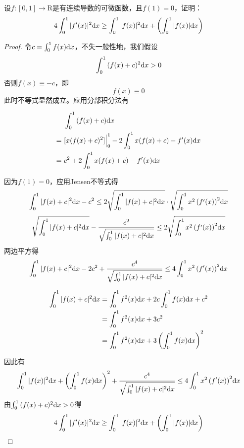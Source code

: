 \begin{proposition}

    设$f:[0,1]\to\mathrm{R}$是有连续导数的可微函数，且$f(1) = 0$，证明：
    $$4\int_{0}^{1}{|f'(x)|^2}\mathrm{d} x \geq \int_{0}^{1}{|f(x)|^2}\mathrm{d} x + \left( \int_{0}^{1}{|f(x)|}\mathrm{d} x \right)$$

\end{proposition}

\begin{proof}
    
    令$c = \int_{0}^{1}{f(x)}\mathrm{d} x$，不失一般性地，我们假设
    $$\int_{0}^{1}{(f(x) + c)^2}\mathrm{d} x > 0$$
    否则$f(x) \equiv -c $，即
    $$f(x) \equiv 0$$
    此时不等式显然成立。应用分部积分法有

    \begin{align*}
        & \int_{0}^{1}{(f(x) + c)}\mathrm{d} x \\
        = \  & [x(f(x) + c)^2] \Big|_{0}^{1} - 2\int_{0}^{1}{x(f(x) + c) - f'(x)}\mathrm{d} x \\
        = \ & c^2 + 2\int_{0}^{1}{x(f(x) + c) - f'(x)}\mathrm{d} x
    \end{align*}

    因为$f(1) = 0$，应用\textup{Jensen}不等式得
    $$ \int_{0}^{1}{|f(x) + c|^2}\mathrm{d} x - c^2 \leq 2\sqrt{\int_{0}^{1}{|f(x) + c|^2}\mathrm{d} x} \cdot \sqrt{\int_{0}^{1}{x^2 \left(f'(x)\right)^2}\mathrm{d} x} $$
    $$ \sqrt{\int_{0}^{1}{|f(x) + c|^2}\mathrm{d} x} - \dfrac{c^2}{\sqrt{\int_{0}^{1}{|f(x) + c|^2}\mathrm{d} x}} \leq 2\sqrt{\int_{0}^{1}{x^2 \left(f'(x)\right)^2}\mathrm{d} x} $$
    两边平方得
    $$\int_{0}^{1}{|f(x) + c|^2}\mathrm{d} x -2c^2 + \dfrac{c^4}{\sqrt{\int_{0}^{1}{|f(x) + c|^2}\mathrm{d} x}} \leq 4 \int_{0}^{1}{x^2 \left(f'(x)\right)^2}\mathrm{d} x $$

    \begin{align*}
        \int_{0}^{1}{|f(x) + c|^2}\mathrm{d} x & = \int_{0}^{1}{f^2(x)}\mathrm{d} x + 2c \int_{0}^{1}{f(x)}\mathrm{d} x + c^2 \\
        & = \int_{0}^{1}{f^2(x)}\mathrm{d} x + 3c^2 \\
        & = \int_{0}^{1}{f^2(x)}\mathrm{d} x + 3\left( \int_{0}^{1}{f(x)}\mathrm{d} x \right)^2
    \end{align*}

    因此有
    $$\int_{0}^{1}{|f(x)|^2}\mathrm{d} x + \left( \int_{0}^{1}{f(x)}\mathrm{d} x \right)^2 + \dfrac{c^4}{\sqrt{\int_{0}^{1}{|f(x) + c|^2}\mathrm{d} x}} \leq 4 \int_{0}^{1}{x^2 \left(f'(x)\right)^2}\mathrm{d} x $$
    由$\int_{0}^{1}{(f(x) + c)^2}\mathrm{d} x > 0$得
    $$4\int_{0}^{1}{|f'(x)|^2}\mathrm{d} x \geq \int_{0}^{1}{|f(x)|^2}\mathrm{d} x + \left( \int_{0}^{1}{|f(x)|}\mathrm{d} x \right)$$

\end{proof}

